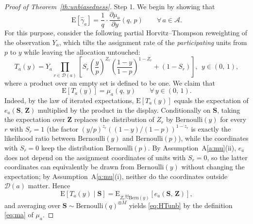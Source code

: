 \documentclass[sigconf]{acmart}
\newcommand{\E}{\mathrm E}
\newcommand{\iidsim}{{\stackrel{\mathrm{iid}}{\sim}}}
\begin{document}
\begin{proof}[Proof of Theorem~\ref{th:unbiasedness}]
Step 1. We begin by showing that
\begin{equation}\label{eq:EhatG=}
    \E[\hat \gamma_a] = \frac 1 q \cdot\frac{\partial\mu_a}{\partial y}(q,\,p)\qquad\forall\,a\in\mathcal A.
\end{equation}
For this purpose, consider the following partial Horvitz--Thompson reweighting of the observation $Y_a$, which tilts the assignment rate of the \emph{participating} units from $p$ to $y$ while leaving the allocation untouched:
\begin{equation*}
    T_a(y) = Y_a\prod_{r\in\mathcal{D}(a)}\left[S_r\left(\frac{y}{p}\right)^{Z_r}\left(\frac{1-y}{1-p}\right)^{1-Z_r} + (1-S_r)\right],\ \  y\in(0,\,1),
\end{equation*}
where a product over an empty set is defined to be one. We claim that
\begin{equation}\label{eq:HTunb}
    \E[T_a(y)] = \mu_a(q,\,y)\qquad \forall\,y\in(0,\,1).
\end{equation}
Indeed, by the law of iterated expectations, $\E[T_a(y)]$ equals the expectation of $e_a(\mathbf S,\,\mathbf Z)$ multiplied by the product in the display. Conditionally on $\mathbf S$, taking the expectation over $\mathbf Z$ replaces the distribution of $Z_r$ by $\mathrm{Bernoulli}(y)$ for every $r$ with $S_r=1$ (the factor $(y/p)^{z_r}((1-y)/(1-p))^{1-z_r}$ is exactly the likelihood ratio between $\mathrm{Bernoulli}(y)$ and $\mathrm{Bernoulli}(p)$), while the coordinates with $S_r=0$ keep the distribution $\mathrm{Bernoulli}(p)$. By Assumption~A\ref{a:mu}(ii), $e_a$ does not depend on the assignment coordinates of units with $S_r=0$, so the latter coordinates can equivalently be drawn from $\mathrm{Bernoulli}(y)$ without changing the expectation; by Assumption~A\ref{a:mu}(i), neither do the coordinates outside $\mathcal D(a)$ matter. Hence
\begin{equation*}
    \E[T_a(y)\mid \mathbf S] = \E_{Z_r\iidsim \mathrm{Bern}(y)}\left[e_a(\mathbf S,\,\mathbf Z)\right],
\end{equation*}
and averaging over $\mathbf S\sim \mathrm{Bernoulli}(q)^{\otimes M}$ yields \eqref{eq:HTunb} by the definition \eqref{eq:ma} of $\mu_a$.


\end{proof}
\end{document}
